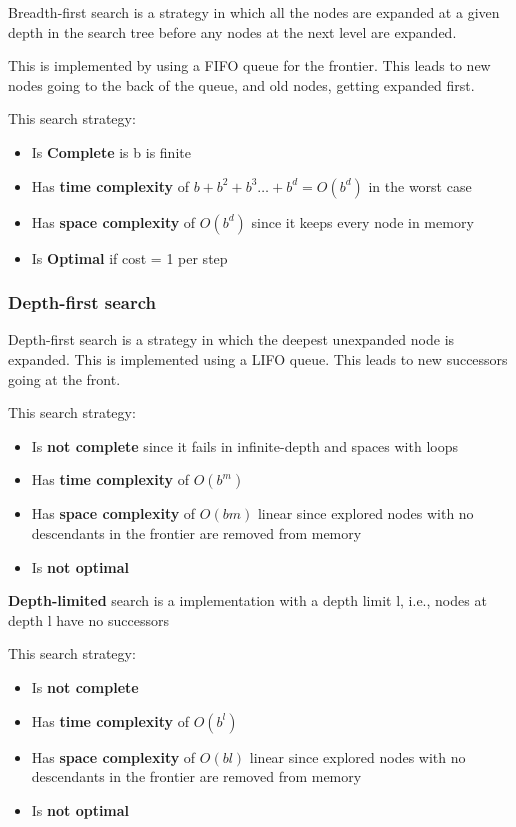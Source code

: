 \documentclass{article}
\begin{document}
Breadth-first search is a strategy in which all the nodes are expanded at a given depth in the search tree before any nodes at the next level are expanded. 

This is implemented by using a FIFO queue for the frontier. This leads to new nodes going to the back of the queue, and old nodes, getting expanded first. 

This search strategy:
\begin{itemize}
    \item Is \textbf{Complete} is b is finite
    \item Has \textbf{time complexity} of $b+b^2+b^3 \ldots +b^d = O(b^d)$ in the worst case
    \item Has \textbf{space complexity} of $O(b^d)$ since it keeps every node in memory
    \item Is \textbf{Optimal} if cost = 1 per step
\end{itemize}

\subsubsection{Depth-first search}

Depth-first search is a strategy in which the deepest unexpanded node is expanded. 
This is implemented using a LIFO queue. This leads to new successors going at the front. 

This search strategy:
\begin{itemize}
    \item Is \textbf{not complete} since it fails in infinite-depth and spaces with loops
    \item Has \textbf{time complexity} of $O(b^m)$ 
    \item Has \textbf{space complexity} of $O(bm)$ linear since explored nodes with no descendants in the frontier are removed from memory
    \item Is \textbf{not optimal}
\end{itemize}

\textbf{Depth-limited} search is a implementation with a depth limit l, i.e., nodes at depth l have no successors

This search strategy:
\begin{itemize}
    \item Is \textbf{not complete} 
    \item Has \textbf{time complexity} of $O(b^l)$ 
    \item Has \textbf{space complexity} of $O(bl)$ linear since explored nodes with no descendants in the frontier are removed from memory
    \item Is \textbf{not optimal}
\end{itemize}
\end{document}
